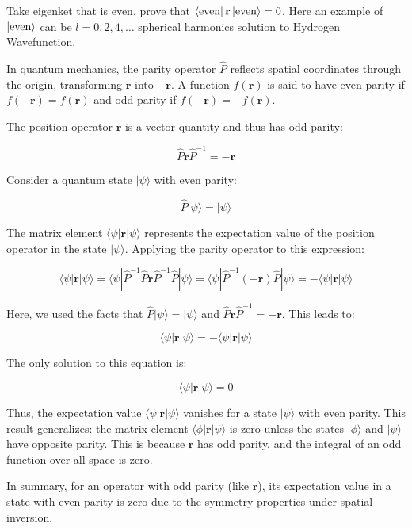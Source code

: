 \documentclass[10pt]{article}
\renewcommand{\vec}{\mathbf}
\renewcommand{\vec}{\mathbf}
\begin{document}
\begin{prob}
	Take eigenket that is even, prove that $\bra{\text{even}}  \vec{r}  \ket{\text{even}} = 0$. Here an example of $\ket{\text{even}}$ can be $l = 0, 2, 4, \ldots$ spherical harmonics solution to Hydrogen Wavefunction.
\end{prob}
\begin{solu}
	\begin{small}
		In quantum mechanics, the parity operator \( \hat{P} \) reflects spatial coordinates through the origin, transforming \( \mathbf{r} \) into \( -\mathbf{r} \). A function \( f(\mathbf{r}) \) is said to have even parity if \( f(-\mathbf{r}) = f(\mathbf{r}) \) and odd parity if \( f(-\mathbf{r}) = -f(\mathbf{r}) \).

The position operator \( \mathbf{r} \) is a vector quantity and thus has odd parity:

\[ \hat{P} \mathbf{r} \hat{P}^{-1} = -\mathbf{r} \]

Consider a quantum state \( | \psi \rangle \) with even parity:

\[ \hat{P} | \psi \rangle = | \psi \rangle \]

The matrix element \( \langle \psi | \mathbf{r} | \psi \rangle \) represents the expectation value of the position operator in the state \( | \psi \rangle \). Applying the parity operator to this expression:

\[ \langle \psi | \mathbf{r} | \psi \rangle = \langle \psi | \hat{P}^{-1} \hat{P} \mathbf{r} \hat{P}^{-1} \hat{P} | \psi \rangle = \langle \psi | \hat{P}^{-1} (-\mathbf{r}) \hat{P} | \psi \rangle = -\langle \psi | \mathbf{r} | \psi \rangle \]

Here, we used the facts that \( \hat{P} | \psi \rangle = | \psi \rangle \) and \( \hat{P} \mathbf{r} \hat{P}^{-1} = -\mathbf{r} \). This leads to:

\[ \langle \psi | \mathbf{r} | \psi \rangle = -\langle \psi | \mathbf{r} | \psi \rangle \]

The only solution to this equation is:

\[ \langle \psi | \mathbf{r} | \psi \rangle = 0 \]

Thus, the expectation value \( \langle \psi | \mathbf{r} | \psi \rangle \) vanishes for a state \( | \psi \rangle \) with even parity. This result generalizes: the matrix element \( \langle \phi | \mathbf{r} | \psi \rangle \) is zero unless the states \( | \phi \rangle \) and \( | \psi \rangle \) have opposite parity. This is because \( \mathbf{r} \) has odd parity, and the integral of an odd function over all space is zero.

In summary, for an operator with odd parity (like \( \mathbf{r} \)), its expectation value in a state with even parity is zero due to the symmetry properties under spatial inversion. 
	\end{small}
\end{solu}
\end{document}
